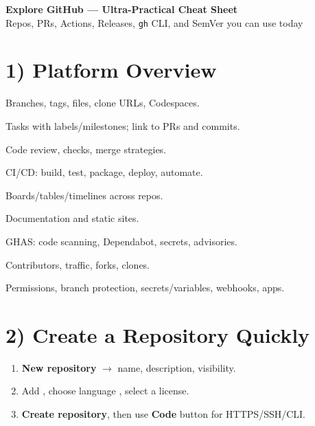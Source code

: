 \documentclass[11pt]{article}
\begin{document}
\begin{center}
{\LARGE \textbf{Explore GitHub --- Ultra-Practical Cheat Sheet}}\\[6pt]
{\small Repos, PRs, Actions, Releases, \texttt{gh} CLI, and SemVer you can use today}
\end{center}

\section*{1) Platform Overview}

\begin{description}[leftmargin=1.5cm, style=nextline]
  \item[Code] Branches, tags, files, clone URLs, Codespaces.
  \item[Issues] Tasks with labels/milestones; link to PRs and commits.
  \item[Pull Requests] Code review, checks, merge strategies.
  \item[Actions] CI/CD: build, test, package, deploy, automate.
  \item[Projects] Boards/tables/timelines across repos.
  \item[Wiki/Pages] Documentation and static sites.
  \item[Security] GHAS: code scanning, Dependabot, secrets, advisories.
  \item[Insights] Contributors, traffic, forks, clones.
  \item[Settings] Permissions, branch protection, secrets/variables, webhooks, apps.
\end{description}


\section*{2) Create a Repository Quickly}

\begin{enumerate}
  \item \textbf{New repository} $\rightarrow$ name, description, visibility.
  \item Add , choose language , select a license.
  \item \textbf{Create repository}, then use \textbf{Code} button for HTTPS/SSH/CLI.
\end{enumerate}
\end{document}
